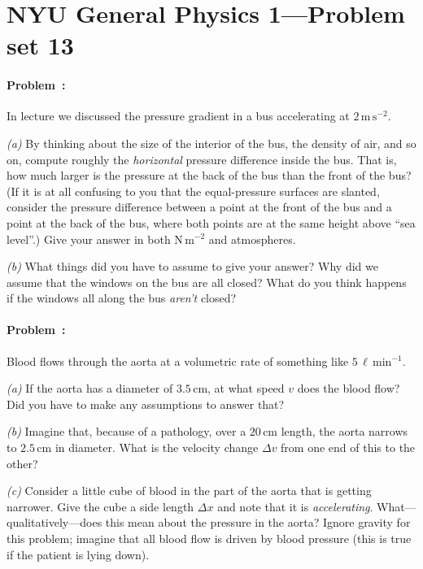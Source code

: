 \documentclass[12pt]{article}
\newcommand{\N}{\mathrm{N}}
\newcommand{\m}{\mathrm{m}}
\newcommand{\cm}{\mathrm{cm}}
\newcommand{\s}{\mathrm{s}}
\renewcommand{\min}{\mathrm{min}}
\renewcommand{\l}{\ell}
\newcounter{problem}
\begin{document}
\thispagestyle{empty}

\section*{NYU General Physics 1---Problem set 13}

\paragraph{Problem~\theproblem:}%
In lecture we discussed the pressure gradient in a bus accelerating at
$2\,\m\,\s^{-2}$.

\textsl{(a)} By thinking about the size of the interior of the bus,
the density of air, and so on, compute roughly the \emph{horizontal}
pressure difference inside the bus.  That is, how much larger is the
pressure at the back of the bus than the front of the bus?  (If it is
at all confusing to you that the equal-pressure surfaces are slanted,
consider the pressure difference between a point at the front of the
bus and a point at the back of the bus, where both points are at the
same height above ``sea level''.)  Give your answer in both
$\N\,\m^{-2}$ and atmospheres.

\textsl{(b)} What things did you have to assume to give your answer?
Why did we assume that the windows on the bus are all closed?
What do you think happens if the windows all along the bus
\emph{aren't} closed?

\paragraph{Problem~\theproblem:}%
Blood flows through the aorta at a volumetric rate of something like
$5\,\l\,\min^{-1}$.

\textsl{(a)} If the aorta has a diameter of $3.5\,\cm$, at what speed
$v$ does the blood flow?  Did you have to make any assumptions to
answer that?

\textsl{(b)} Imagine that, because of a pathology, over a $20\,\cm$
length, the aorta narrows to $2.5\,\cm$ in diameter.  What is the
velocity change $\Delta v$ from one end of this to the other?

\textsl{(c)} Consider a little cube of blood in the part of the aorta
that is getting narrower.  Give the cube a side length $\Delta x$ and
note that it is \emph{accelerating}.  What---qualitatively---does this
mean about the pressure in the aorta?  Ignore gravity for this
problem; imagine that all blood flow is driven by blood pressure (this
is true if the patient is lying down).
\end{document}
